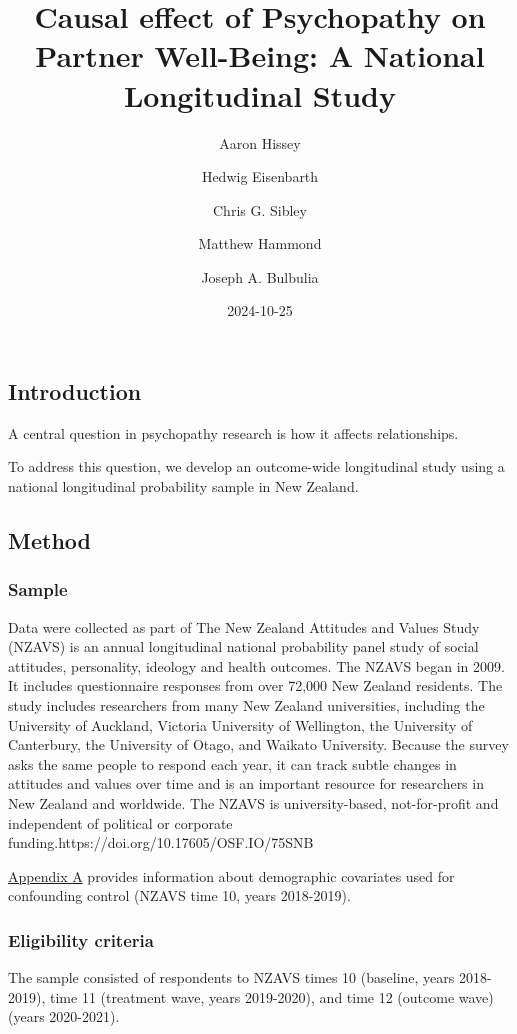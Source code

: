 \documentclass[
  singlecolumn]{article}
\title{Causal effect of Psychopathy on Partner Well-Being: A National
Longitudinal Study}
\author{Aaron Hissey \and Hedwig Eisenbarth \and Chris G.
Sibley \and Matthew Hammond \and Joseph A. Bulbulia}
\date{2024-10-25}
\begin{document}
\maketitle


\subsection{Introduction}\label{introduction}

A central question in psychopathy research is how it affects
relationships.

To address this question, we develop an outcome-wide longitudinal study
using a national longitudinal probability sample in New Zealand.

\subsection{Method}\label{method}

\subsubsection{Sample}\label{sample}

Data were collected as part of The New Zealand Attitudes and Values
Study (NZAVS) is an annual longitudinal national probability panel study
of social attitudes, personality, ideology and health outcomes. The
NZAVS began in 2009. It includes questionnaire responses from over
72,000 New Zealand residents. The study includes researchers from many
New Zealand universities, including the University of Auckland, Victoria
University of Wellington, the University of Canterbury, the University
of Otago, and Waikato University. Because the survey asks the same
people to respond each year, it can track subtle changes in attitudes
and values over time and is an important resource for researchers in New
Zealand and worldwide. The NZAVS is university-based, not-for-profit and
independent of political or corporate
funding.https://doi.org/10.17605/OSF.IO/75SNB

\hyperref[appendix-demographics]{Appendix A} provides information about
demographic covariates used for confounding control (NZAVS time 10,
years 2018-2019).

\subsubsection{Eligibility criteria}\label{eligibility-criteria}

The sample consisted of respondents to NZAVS times 10 (baseline, years
2018-2019), time 11 (treatment wave, years 2019-2020), and time 12
(outcome wave) (years 2020-2021).
\end{document}
